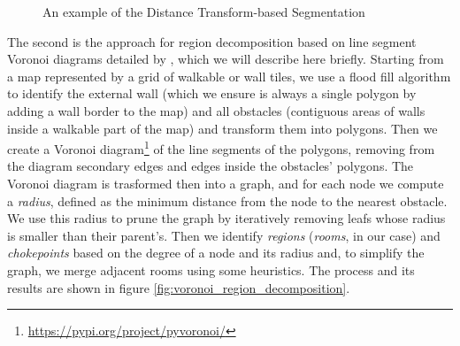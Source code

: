 \documentclass{Configuration_Files/PoliMi3i_thesis}
\begin{document}
\begin{figure}[H]
    \centering
    \qquad
    \caption[Distance Transform Segmentation example]{An example of the Distance Transform-based Segmentation}
    \label{fig:dt_segmentation}
\end{figure}

The second is the approach for region decomposition based on line segment Voronoi diagrams detailed by \citet{perkins_terrain_2010}, which we will describe here briefly. Starting from a map represented by a grid of walkable or wall tiles, we use a flood fill algorithm to identify the external wall (which we ensure is always a single polygon by adding a wall border to the map) and all obstacles (contiguous areas of walls inside a walkable part of the map) and transform them into polygons. Then we create a Voronoi diagram\footnote{\raggedright\url{https://pypi.org/project/pyvoronoi/}} of the line segments of the polygons, removing from the diagram secondary edges and edges inside the obstacles' polygons. The Voronoi diagram is trasformed then into a graph, and for each node we compute a \textit{radius}, defined as the minimum distance from the node to the nearest obstacle. We use this radius to prune the graph by iteratively removing leafs whose radius is smaller than their parent's. Then we identify \textit{regions} (\textit{rooms}, in our case) and \textit{chokepoints} based on the degree of a node and its radius and, to simplify the graph, we merge adjacent rooms using some heuristics. The process and its results are shown in figure \ref{fig:voronoi_region_decomposition}.
\end{document}
